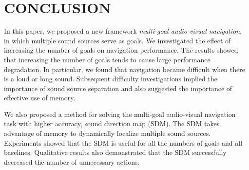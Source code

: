 \section{CONCLUSION}
\label{CONCLUSION}

In this paper, we proposed a new framework \textit{multi-goal audio-visual navigation}, in which multiple sound sources serve as goals. We investigated the effect of increasing the number of goals on navigation performance.
The results showed that increasing the number of goals tends to cause large performance degradation.
In particular, we found that navigation became difficult when there is a loud or long sound.
Subsequent difficulty investigations implied the importance of sound source separation and also suggested the importance of effective use of memory.

We also proposed a method for solving the multi-goal audio-visual navigation task with higher accuracy, sound direction map (SDM).
The SDM takes advantage of memory to dynamically localize multiple sound sources.
Experiments showed that the SDM is useful for all the numbers of goals and all baselines.
Qualitative results also demonstrated that the SDM successfully decreased the number of unnecessary actions.